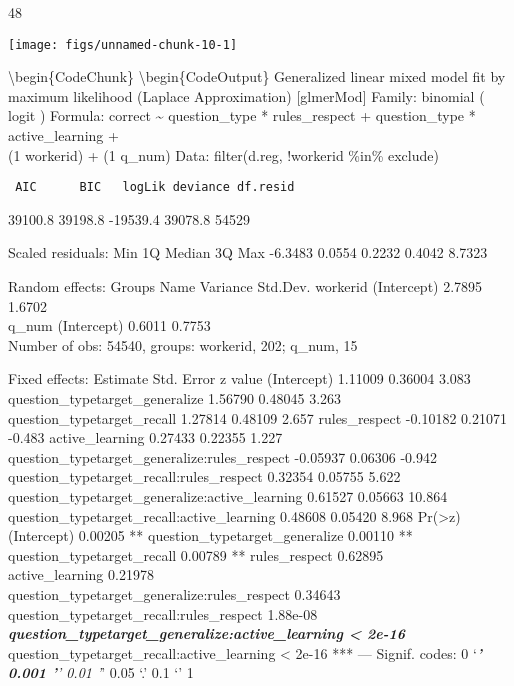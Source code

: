 \documentclass[10pt, letterpaper]{article}
\newenvironment{CodeChunk}{}{}
\begin{document}
\begin{CodeChunk}
\begin{CodeOutput}
[1] 48
\end{CodeOutput}
\end{CodeChunk}

\begin{CodeChunk}

\texttt{[image: figs/unnamed-chunk-10-1]} \end{CodeChunk}

\textbackslash{}begin\{CodeChunk\} \textbackslash{}begin\{CodeOutput\}
Generalized linear mixed model fit by maximum likelihood (Laplace
Approximation) {[}glmerMod{]} Family: binomial ( logit ) Formula:
correct \textasciitilde{} question\_type * rules\_respect +
question\_type * active\_learning +\\ (1 \textbar{} workerid) + (1
\textbar{} q\_num) Data: filter(d.reg, !workerid \%in\% exclude)

\begin{verbatim}
 AIC      BIC   logLik deviance df.resid 
\end{verbatim}

39100.8 39198.8 -19539.4 39078.8 54529

Scaled residuals: Min 1Q Median 3Q Max -6.3483 0.0554 0.2232 0.4042
8.7323

Random effects: Groups Name Variance Std.Dev. workerid (Intercept)
2.7895 1.6702\\ q\_num (Intercept) 0.6011 0.7753\\Number of obs: 54540,
groups: workerid, 202; q\_num, 15

Fixed effects: Estimate Std. Error z value (Intercept) 1.11009 0.36004
3.083 question\_typetarget\_generalize 1.56790 0.48045 3.263
question\_typetarget\_recall 1.27814 0.48109 2.657 rules\_respect
-0.10182 0.21071 -0.483 active\_learning 0.27433 0.22355 1.227
question\_typetarget\_generalize:rules\_respect -0.05937 0.06306 -0.942
question\_typetarget\_recall:rules\_respect 0.32354 0.05755 5.622
question\_typetarget\_generalize:active\_learning 0.61527 0.05663 10.864
question\_typetarget\_recall:active\_learning 0.48608 0.05420 8.968
Pr(\textgreater{}\textbar{}z\textbar{})\\(Intercept) 0.00205 **
question\_typetarget\_generalize 0.00110 ** question\_typetarget\_recall
0.00789 ** rules\_respect 0.62895\\active\_learning
0.21978\\question\_typetarget\_generalize:rules\_respect
0.34643\\question\_typetarget\_recall:rules\_respect 1.88e-08
\textbf{\emph{ question\_typetarget\_generalize:active\_learning
\textless{} 2e-16 }} question\_typetarget\_recall:active\_learning
\textless{} 2e-16 *** --- Signif. codes: 0 `\emph{\textbf{' 0.001 '}'
0.01 '}' 0.05 `.' 0.1 `' 1
\end{document}
